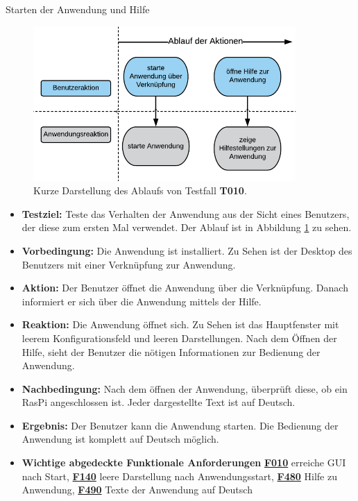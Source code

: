 \documentclass[parskip=full]{scrartcl}
\begin{document}
\begin{description} 

\hypertarget{link-t010}{\item[T010]}Starten der Anwendung und Hilfe

\begin{figure}[htbp]
	\begin{center}
		\includegraphics[width = 10cm]{Grafik/T010-Ablauf.png}
		\caption{Kurze Darstellung des Ablaufs von Testfall \textbf{T010}.}
		\label{T010-Ablauf}
	\end{center}
\end{figure}
\begin{itemize}

\item []\textbf{Testziel:} Teste das Verhalten der Anwendung aus der Sicht eines Benutzers, der diese zum ersten Mal verwendet. Der Ablauf ist in Abbildung \ref{T010-Ablauf} zu sehen.

\item []\textbf{Vorbedingung:} Die Anwendung ist installiert. Zu Sehen ist der Desktop des Benutzers mit einer Verknüpfung zur Anwendung.
\item []\textbf{Aktion:} Der Benutzer öffnet die Anwendung über die Verknüpfung. Danach informiert er sich über die Anwendung mittels der Hilfe.
\item []\textbf{Reaktion:} Die Anwendung öffnet sich. Zu Sehen ist das Hauptfenster mit leerem Konfigurationsfeld und leeren Darstellungen. Nach dem Öffnen der Hilfe, sieht der Benutzer die nötigen Informationen zur Bedienung der Anwendung. 
\item []\textbf{Nachbedingung:} Nach dem öffnen der Anwendung, überprüft diese, ob ein \gls{RasPi} angeschlossen ist. Jeder dargestellte Text ist auf Deutsch.

\item []\textbf{Ergebnis:} Der Benutzer kann die Anwendung starten. Die Bedienung der Anwendung ist komplett auf Deutsch möglich.
\item []\textbf{Wichtige abgedeckte Funktionale Anforderungen} \hyperlink{link-f010}{\textbf{F010}} erreiche GUI nach Start, \hyperlink{link-f140}{\textbf{F140}} leere Darstellung nach Anwendungsstart, \hyperlink{link-f480}{\textbf{F480}} Hilfe zu Anwendung, \hyperlink{link-f490}{\textbf{F490}} Texte der Anwendung auf Deutsch


\end{itemize}
\end{description}
\end{document}
